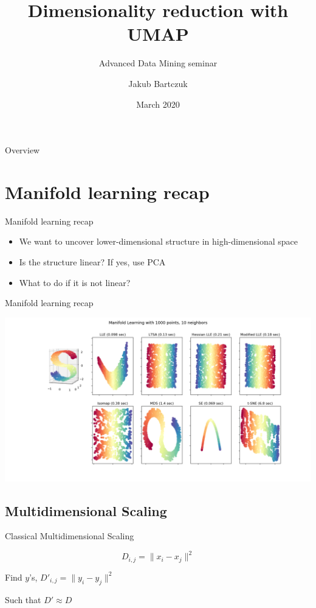 \documentclass[unknownkeysallowed]{beamer}
\title{Dimensionality reduction with UMAP}
\subtitle{Advanced Data Mining seminar}
\author{Jakub Bartczuk}
\date{March 2020}
\begin{document}
\maketitle

\begin{frame}{Overview}
\end{frame}

\section{Manifold learning recap}
\begin{frame}{Manifold learning recap}

\begin{itemize}
\item We want to uncover lower-dimensional structure in high-dimensional space
\item Is the structure linear? If yes, use PCA
\item What to do if it is not linear?
\end{itemize}
\end{frame}
\begin{frame}{Manifold learning recap}

\includegraphics[width=\textwidth,height=0.8\textheight,keepaspectratio]{manifold_algorithms}

\end{frame}

\subsection{Multidimensional Scaling}
\begin{frame}{Classical Multidimensional Scaling}


$$D_{i,j} = \|x_i - x_j\|^2$$

Find $y$'s, $D'_{i,j} = \|y_i - y_j\|^2$ 

Such that $D' \approx D$

\end{frame}
\end{document}
